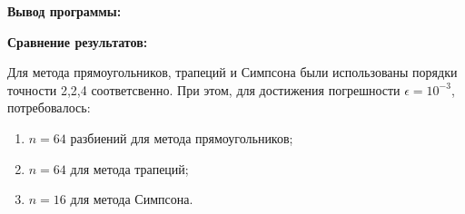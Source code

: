 



% 

\newpage
\textbf{Вывод программы:}


\textbf{Сравнение результатов:}

Для метода прямоугольников, трапеций и Симпсона были использованы порядки точности 2,2,4 соответсвенно.
При этом, для достижения погрешности $\epsilon = 10^{-3}$, потребовалось:
\begin{enumerate}
    \item $n=64$ разбиений для метода прямоугольников;
    \item $n=64$ для метода трапеций;
    \item $n=16$ для метода Симпсона.
\end{enumerate}